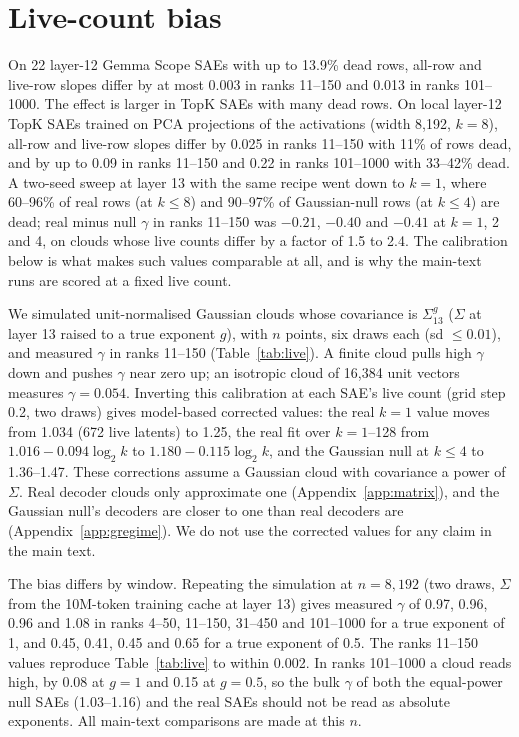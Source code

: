 \documentclass[10pt,twocolumn]{article}
\newcommand{\Sig}{\Sigma}
\begin{document}
\section{Live-count bias}
\label{app:live}

On 22 layer-12 Gemma Scope SAEs with up to 13.9\% dead rows, all-row and live-row slopes differ by at most 0.003 in ranks 11--150 and 0.013 in ranks 101--1000. The effect is larger in TopK SAEs with many dead rows. On local layer-12 TopK SAEs trained on PCA projections of the activations (width 8,192, $k=8$), all-row and live-row slopes differ by 0.025 in ranks 11--150 with 11\% of rows dead, and by up to 0.09 in ranks 11--150 and 0.22 in ranks 101--1000 with 33--42\% dead. A two-seed sweep at layer 13 with the same recipe went down to $k=1$, where 60--96\% of real rows (at $k \le 8$) and 90--97\% of Gaussian-null rows (at $k \le 4$) are dead; real minus null $\gamma$ in ranks 11--150 was $-0.21$, $-0.40$ and $-0.41$ at $k=1$, 2 and 4, on clouds whose live counts differ by a factor of 1.5 to 2.4. The calibration below is what makes such values comparable at all, and is why the main-text runs are scored at a fixed live count.

We simulated unit-normalised Gaussian clouds whose covariance is $\Sig_{13}^{g}$ ($\Sig$ at layer 13 raised to a true exponent $g$), with $n$ points, six draws each (sd $\le 0.01$), and measured $\gamma$ in ranks 11--150 (Table~\ref{tab:live}). A finite cloud pulls high $\gamma$ down and pushes $\gamma$ near zero up; an isotropic cloud of 16,384 unit vectors measures $\gamma=0.054$. Inverting this calibration at each SAE's live count (grid step 0.2, two draws) gives model-based corrected values: the real $k=1$ value moves from 1.034 (672 live latents) to 1.25, the real fit over $k=1$--128 from $1.016-0.094\log_2 k$ to $1.180-0.115\log_2 k$, and the Gaussian null at $k \le 4$ to 1.36--1.47. These corrections assume a Gaussian cloud with covariance a power of $\Sig$. Real decoder clouds only approximate one (Appendix~\ref{app:matrix}), and the Gaussian null's decoders are closer to one than real decoders are (Appendix~\ref{app:gregime}). We do not use the corrected values for any claim in the main text.

The bias differs by window. Repeating the simulation at $n=8{,}192$ (two draws, $\Sig$ from the 10M-token training cache at layer 13) gives measured $\gamma$ of 0.97, 0.96, 0.96 and 1.08 in ranks 4--50, 11--150, 31--450 and 101--1000 for a true exponent of 1, and 0.45, 0.41, 0.45 and 0.65 for a true exponent of 0.5. The ranks 11--150 values reproduce Table~\ref{tab:live} to within 0.002. In ranks 101--1000 a cloud reads high, by 0.08 at $g=1$ and 0.15 at $g=0.5$, so the bulk $\gamma$ of both the equal-power null SAEs (1.03--1.16) and the real SAEs should not be read as absolute exponents. All main-text comparisons are made at this $n$.
\end{document}
